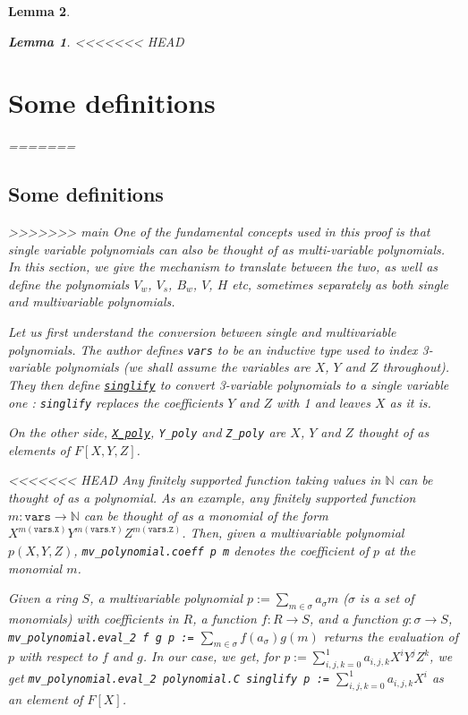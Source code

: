 \documentclass{article}
\newtheorem{lemma}{Lemma}
\theoremstyle{definition}
\theoremstyle{remark}
\begin{document}
\begin{lemma}
\begin{lemma}
<<<<<<< HEAD
\section{Some definitions}
=======
\subsection{Some definitions}
>>>>>>> main
One of the fundamental concepts used in this proof is that single variable polynomials can also be thought of as multi-variable polynomials. In this section, we give the mechanism to translate between the two, as well as 
define the polynomials $V_w$, $V_s$, $B_w$, $V$, $H$ etc, sometimes separately as both single and multivariable polynomials. 

Let us first understand the conversion between single and multivariable polynomials. The author defines \texttt{vars} to be an inductive type used to index 3-variable polynomials (we shall assume the variables are $X$, $Y$ 
and $Z$ throughout). They then define \href{https://github.com/BoltonBailey/formal-snarks-project/blob/7fd9cd122f5887f88f6a706b4f2a68a7153c7381/src/snarks/babysnark/knowledge_soundness.lean#L139}{\texttt{singlify}} to 
convert 3-variable polynomials to a single variable one : \texttt{singlify} replaces the coefficients $Y$ and $Z$ with 1 and leaves $X$ as it is.

On the other side, \href{https://github.com/BoltonBailey/formal-snarks-project/blob/7fd9cd122f5887f88f6a706b4f2a68a7153c7381/src/snarks/babysnark/knowledge_soundness.lean#L145}{\texttt{X\_poly}}, \texttt{Y\_poly} and 
\texttt{Z\_poly} are $X$, $Y$ and $Z$ thought of as elements of $F[X, Y, Z]$.

<<<<<<< HEAD
Any finitely supported function taking values in $\mathbb{N}$ can be thought of as a polynomial. As an example, any finitely supported function 
$m : \texttt{vars} \to \mathbb{N}$ can be thought of as a monomial of the form $X^{m(\texttt{vars.X})} Y^{m(\texttt{vars.Y})} Z^{m(\texttt{vars.Z})}$. Then, 
given a multivariable polynomial $p(X, Y, Z)$, \texttt{mv\_polynomial.coeff p m} denotes the coefficient of $p$ at the monomial $m$.

Given a ring $S$, a multivariable polynomial $p := \sum_{m \in \sigma} a_{\sigma} m$ ($\sigma$ is a set of monomials) with coefficients in $R$, 
a function $f : R \to S$, and a function $g : \sigma \to S$, \texttt{mv\_polynomial.eval\_2 f g p :=} $\sum_{m \in \sigma} f(a_{\sigma}) g(m)$ returns the evaluation of $p$ with respect to $f$ and $g$. 
In our case, we get, for $p := \sum_{i, j, k = 0}^{1} a_{i, j ,k} X^i Y^j Z^k$, we get \texttt{mv\_polynomial.eval\_2 polynomial.C singlify p :=} $\sum_{i, j, k = 0}^{1} a_{i, j ,k} X^i$ as an element of $F[X]$.


\end{lemma}
\end{lemma}
\end{document}
